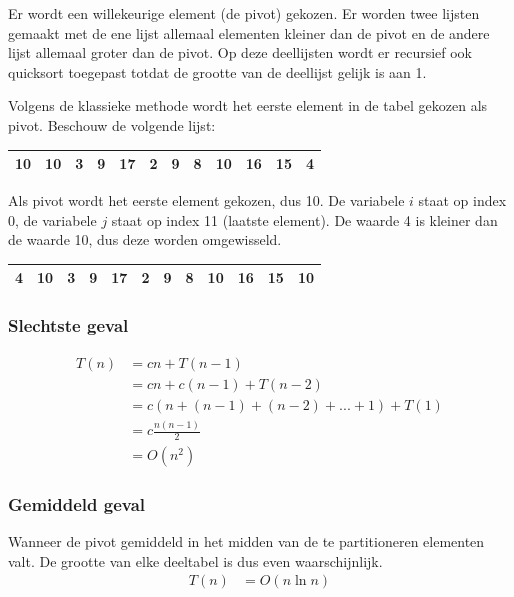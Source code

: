 \documentclass[12pt]{report}
\begin{document}
Er wordt een willekeurige element (de pivot) gekozen. Er worden twee lijsten gemaakt met de ene lijst allemaal elementen kleiner dan de pivot en de andere lijst allemaal groter dan de pivot. Op deze deellijsten wordt er recursief ook quicksort toegepast totdat de grootte van de deellijst gelijk is aan 1.

Volgens de klassieke methode wordt het eerste element in de tabel gekozen als pivot.
Beschouw de volgende lijst:


\begin{tabular}{| c | c | c | c | c | c | c | c | c | c | c | c |}
 \hline
 10 & 10 & 3 & 9 & 17 & 2 & 9 & 8 & 10 & 16 & 15 & 4 \\
 \hline
\end{tabular}

Als pivot wordt het eerste element gekozen, dus 10. De variabele $i$ staat op index 0, de variabele $j$ staat op index 11 (laatste element). De waarde 4 is kleiner dan de waarde 10, dus deze worden omgewisseld.

\begin{tabular}{| c | c | c | c | c | c | c | c | c | c | c | c |}
 \hline
 4 & 10 & 3 & 9 & 17 & 2 & 9 & 8 & 10 & 16 & 15 & 10 \\
 \hline
\end{tabular}
\subsubsection{Slechtste geval}
\begin{equation*}
 \begin{split}
  T(n)          & = cn + T(n - 1)\\
                & = cn + c(n - 1) + T(n - 2) \\
                & = c(n + (n - 1) + (n - 2) + ... + 1) + T(1) \\
                & =c\frac{n(n - 1)}{2} \\
                & = O(n^2)
 \end{split}
\end{equation*}

\subsubsection{Gemiddeld geval}
Wanneer de pivot gemiddeld in het midden van de te partitioneren elementen valt. De grootte van elke deeltabel is dus even waarschijnlijk.
\begin{equation*}
 \begin{split}
  T(n) & = O(n \ln n)
 \end{split}
\end{equation*}
\end{document}
